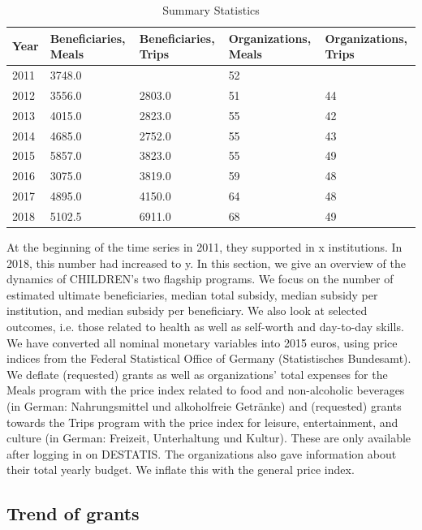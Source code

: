\documentclass[12pt, a4paper, titlepage]{article}\usepackage[]{graphicx}\usepackage[]{color}
\begin{document}
\begin{table}[ht]
\centering
\begin{tabular}{mmmmm}
  \hline
Year & Beneficiaries, Meals & Beneficiaries, Trips & Organizations, Meals & Organizations, Trips \\ 
  \hline
2011 & 3748.0 &  & 52 &  \\ 
  2012 & 3556.0 & 2803.0 & 51 & 44 \\ 
  2013 & 4015.0 & 2823.0 & 55 & 42 \\ 
  2014 & 4685.0 & 2752.0 & 55 & 43 \\ 
  2015 & 5857.0 & 3823.0 & 55 & 49 \\ 
  2016 & 3075.0 & 3819.0 & 59 & 48 \\ 
  2017 & 4895.0 & 4150.0 & 64 & 48 \\ 
  2018 & 5102.5 & 6911.0 & 68 & 49 \\ 
   \hline
\end{tabular}
\caption{Summary Statistics} 
\end{table}


At the beginning of the time series in 2011, they supported in x institutions. In 2018, this number had increased to y. In this section, we give an overview of the dynamics of CHILDREN's two flagship programs. We focus on the number of estimated ultimate beneficiaries, median total subsidy, median subsidy per institution, and median subsidy per beneficiary. We also look at selected outcomes, i.e. those related to health as well as self-worth and day-to-day skills. We have converted all nominal monetary variables into 2015 euros, using price indices from the Federal Statistical Office of Germany (Statistisches Bundesamt). We deflate (requested) grants as well as organizations' total expenses for the Meals program  with the price index related to food and non-alcoholic beverages (in German: Nahrungsmittel und alkoholfreie Getränke) and (requested) grants towards the Trips program with the price index for leisure, entertainment, and culture (in German: Freizeit, Unterhaltung und Kultur). These are only available after logging in on DESTATIS. The organizations also gave information about their total yearly budget. We inflate this with the general price index.    

\subsection{Trend of grants} 
\end{document}
